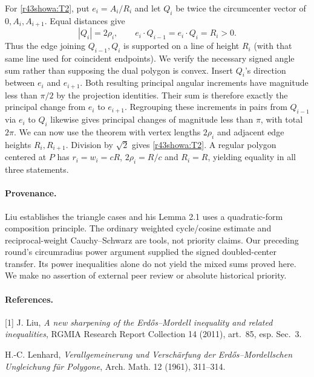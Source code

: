 \documentclass[11pt,a4paper]{article}
\numberwithin{equation}{section}
\theoremstyle{definition}
\theoremstyle{remark}
\begin{document}
For \eqref{r43showa:T2}, put $e_i=A_i/R_i$ and let $Q_i$ be twice the circumcenter vector of $0,A_i,A_{i+1}$. Equal distances give
\[
 |Q_i|=2\rho_i,\qquad e_i\cdot Q_{i-1}=e_i\cdot Q_i=R_i>0 .
\]
Thus the edge joining $Q_{i-1},Q_i$ is supported on a line of height $R_i$ (with that same line used for coincident endpoints). We verify the necessary signed angle sum rather than supposing the dual polygon is convex. Insert $Q_i$'s direction between $e_i$ and $e_{i+1}$. Both resulting principal angular increments have magnitude less than $\pi/2$ by the projection identities. Their sum is therefore exactly the principal change from $e_i$ to $e_{i+1}$. Regrouping these increments in pairs from $Q_{i-1}$ via $e_i$ to $Q_i$ likewise gives principal changes of magnitude less than $\pi$, with total $2\pi$. We can now use the theorem with vertex lengths $2\rho_i$ and adjacent edge heights $R_i,R_{i+1}$. Division by $\sqrt2$ gives \eqref{r43showa:T2}. A regular polygon centered at $P$ has $r_i=w_i=cR$, $2\rho_i=R/c$ and $R_i=R$, yielding equality in all three statements.
\paragraph{Provenance.}
Liu establishes the triangle cases and his Lemma 2.1 uses a quadratic-form composition principle. The ordinary weighted cycle/cosine estimate and reciprocal-weight Cauchy--Schwarz are tools, not priority claims. Our preceding round's circumradius power argument supplied the signed doubled-center transfer. Its power inequalities alone do not yield the mixed sums proved here. We make no assertion of external peer review or absolute historical priority.
\paragraph{References.}
[1] J. Liu, \emph{A new sharpening of the Erd\H{o}s--Mordell inequality and related inequalities}, RGMIA Research Report Collection 14 (2011), art.~85, esp. Sec.~3.\par
[2] H.-C. Lenhard, \emph{Verallgemeinerung und Versch\"arfung der Erd\H{o}s--Mordellschen Ungleichung f\"ur Polygone}, Arch. Math. 12 (1961), 311--314.

\par\endgroup

\begingroup
\newcommand{\Var}{\operatorname{Var}}
\end{document}
